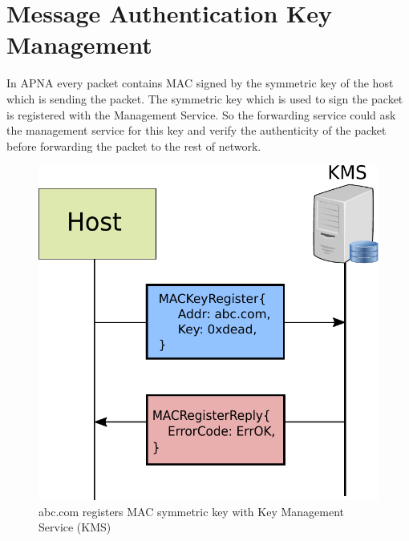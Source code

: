 \section{Message Authentication Key Management}
In APNA every packet contains MAC signed by the symmetric key of the host which is sending the packet. The symmetric key which is used to sign the packet is registered with the Management Service. So the forwarding service could ask the management service for this key and verify the authenticity of the packet before forwarding the packet to the rest of network.

\begin{figure}[th!]
\centering
\includegraphics[scale=0.6]{Figures/kms.pdf}
\decoRule
\caption[MAC Key Register]{abc.com registers MAC symmetric key with Key Management Service (KMS)}
\label{fig:kms_register}
\end{figure}


